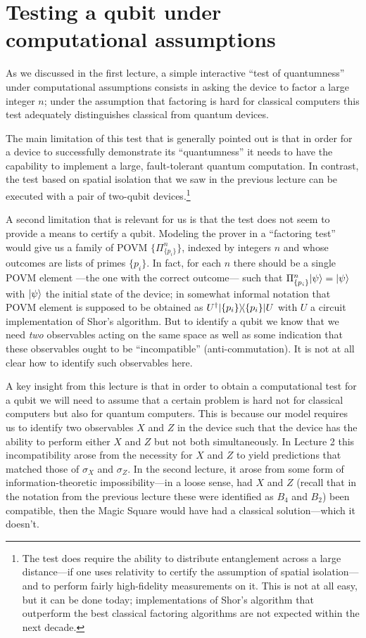 \chapter{Testing a qubit under computational assumptions}

As we discussed in the first lecture, a simple interactive ``test of quantumness'' under computational assumptions consists in asking the device to factor a large integer $n$; under the assumption that factoring is hard for classical computers this test adequately distinguishes classical from quantum devices. 

The main limitation of this test that is generally pointed out is that in order for a device to successfully demonstrate its ``quantumness'' it needs to have the capability to implement a large, fault-tolerant quantum computation. In contrast, the test based on spatial isolation that we saw in the previous lecture can be executed with a pair of two-qubit devices.\footnote{The test does require the ability to distribute entanglement across a large distance---if one uses relativity to certify the assumption of spatial isolation---and to perform fairly high-fidelity measurements on it. This is not at all easy, but it can be done today; implementations of Shor's algorithm that outperform the best classical factoring algorithms are not expected within the next decade.}

A second limitation that is relevant for us is that the test does not seem to provide a means to certify a qubit. Modeling the prover in a ``factoring test'' would give us a family of POVM $\{\Pi^n_{\{p_i\}}\}$, indexed by integers $n$ and whose outcomes are lists of primes $\{p_i\}$. In fact, for each $n$ there should be a single POVM element ---the one with the correct outcome--- such that $\Pi^n_{\{p_i\}} |\psi\rangle = |\psi\rangle$ with $|\psi\rangle$ the initial state of the device; in somewhat informal notation that POVM element is supposed to be obtained as $U^\dagger |\{p_i\}\rangle\!\langle\{p_i\}| U$ with $U$ a circuit implementation of Shor's algorithm. But to identify a qubit we know that we need \emph{two} observables acting on the same space as well as some indication that these observables ought to be ``incompatible'' (anti-commutation). It is not at all clear how to identify such observables here. 

A key insight from this lecture is that in order to obtain a computational test for a qubit we will need to assume that a certain problem is hard not for classical computers but also for quantum computers. This is because our model requires us to identify two observables $X$ and $Z$ in the device such that the device has the ability to perform either $X$ and $Z$ but not both simultaneously. In Lecture 2 this incompatibility arose from the necessity for $X$ and $Z$ to yield predictions that matched those of $\sigma_X$ and $\sigma_Z$. In the second lecture, it arose from some form of information-theoretic impossibility---in a loose sense, had $X$ and $Z$ (recall that in the notation from the previous lecture these were identified as $B_4$ and $B_2$) been compatible, then the Magic Square would have had a classical solution---which it doesn't. 

